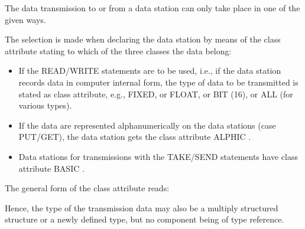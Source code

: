 The data transmission to or from a data station can only take place in
one of the given ways.

The selection is made when declaring the data station by means of the
class attribute stating to which of the three classes the data belong:
\begin{itemize}
\item If the READ/WRITE statements are to be used, i.e., if the data
station records data in computer internal form, the type of data to be
transmitted is stated as class attribute, e.g., FIXED, or FLOAT, %
or BIT (16), or ALL  (for various types).
\item If the data are represented alphanumerically on the data stations
(case PUT/GET), the data station gets the class attribute 
ALPHIC .
\item Data stations for transmissions with the TAKE/SEND statements
have class attribute BASIC .
\end{itemize}

The general form of the class attribute reads:














Hence, the type of the transmission data may also be a multiply
structured structure or a newly defined type, but no component being of
type reference.

